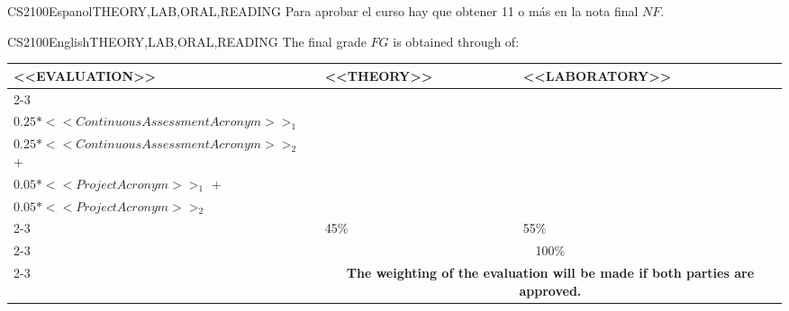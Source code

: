 \begin{evaluation}{CS2100}{Espanol}{THEORY,LAB,ORAL,READING}
  \noindent Para aprobar el curso hay que obtener 11 o más en la nota final $NF$.
  \end{evaluation}
 
  \begin{evaluation}{CS2100}{English}{THEORY,LAB,ORAL,READING}
  The final grade $FG$ is obtained through of:
 
  \begin{tabularx}{0.9\textwidth}{|X|p{}|p{}|} \hline
    \multirow{4}{*}{\uppercase{<<Evaluation>>}} & \uppercase{<<Theory>>} & \uppercase{<<Laboratory>>} \\ \cline{2-3}
    & %
        \begin{minipage}{0.95\textwidth}
        \begin{tabular}{l}
            $0.20*<<ExamAcronym>>_{1}$  + \\
            $0.25*<<ContinuousAssessmentAcronym>>_{1}$
            \end{tabular} 
        \end{minipage} 
    & %
        \begin{minipage}{0.95\textwidth}
        \begin{tabular}{l}
            $0.20*<<ExamAcronym>>_{1}$  + \\
            $0.25*<<ContinuousAssessmentAcronym>>_{2}$  +\\
            $0.05*<<ProjectAcronym>>_{1}$ + \\
            $0.05*<<ProjectAcronym>>_{2}$
            \end{tabular} 
        \end{minipage}                 \\ \cline{2-3}
    
    & %
    45\% 
    & %
    55\% \\ \cline{2-3}
    & \multicolumn{2}{c|}{100\%} \\ \cline{2-3}
    & \multicolumn{2}{c|}{\textbf{The weighting of the evaluation will be made if both parties are approved.}}  \\ \hline
    \end{tabularx}
    

\end{evaluation}
